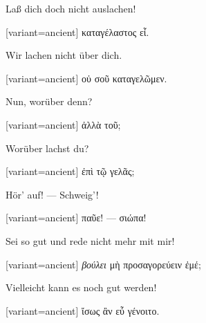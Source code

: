 Laß dich doch nicht aus\textcompwordmark{}lachen! 

\switchcolumn

\begin{greek}[variant=ancient]%
καταγέλαστος εἶ.

\end{greek}%
\switchcolumn*

Wir lachen nicht über dich. 

\switchcolumn

\begin{greek}[variant=ancient]%
οὐ σοῦ καταγελῶμεν.

\end{greek}%
\switchcolumn*

Nun, worüber denn? 

\switchcolumn

\begin{greek}[variant=ancient]%
ἀλλὰ τοῦ;

\end{greek}%
\switchcolumn*

Worüber lachst du? 

\switchcolumn

\begin{greek}[variant=ancient]%
ἐπὶ τῷ γελᾶς;

\end{greek}%
\switchcolumn*

Hör' auf! — Schweig'! 

\switchcolumn

\begin{greek}[variant=ancient]%
παῦε! — σιώπα!

\end{greek}%
\switchcolumn*

Sei so gut und rede nicht mehr mit mir! 

\switchcolumn

\begin{greek}[variant=ancient]%
\emph{βούλει} μὴ προσαγορεύειν ἐμέ;

\end{greek}%
Vielleicht kann es noch gut werden! 

\switchcolumn

\begin{greek}[variant=ancient]%
ἴσως ἂν εὖ γένοιτο.

\end{greek}%
\switchcolumn*

